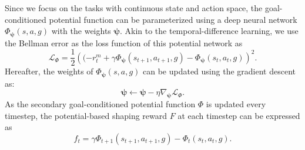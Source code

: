 \documentclass[journal]{IEEEtran}
\begin{document}
Since we focus on the tasks with continuous state and action space, the goal-conditioned potential function can be parameterized using a deep neural network $\Phi_{\bm{\psi}}(s,a,g)$ with the weights $\bm{\psi}$.
Akin to the temporal-difference learning, we use the Bellman error as the loss function of this potential network as
\begin{equation}
    \mathcal{L}_{\Phi} = \frac{1}{2} \left((-r^{m}_{t} + \gamma\Phi_{\bm{\psi}}(s_{t+1},a_{t+1},g) - \Phi_{\bm{\psi}}(s_t,a_t,g)\right)^{2}.
\label{loss-func}
\end{equation}
Hereafter, the weights of $\Phi_{\bm{\psi}}(s,a,g)$ can be updated using the gradient descent as: 
\begin{equation}
    \bm{\psi}\leftarrow \bm{\psi} - \eta\nabla_{\bm{\psi}}\mathcal{L}_{\Phi}.
\label{update-psi}
\end{equation}
As the secondary goal-conditioned potential function $\Phi$ is updated every timestep, the potential-based shaping reward $F$ at each timestep can be expressed as
\begin{equation}
    f_{t} = \gamma\Phi_{t+1}(s_{t+1},a_{t+1},g) - \Phi_{t}(s_t,a_t,g).
\label{shaping-reward}
\end{equation}
\end{document}
